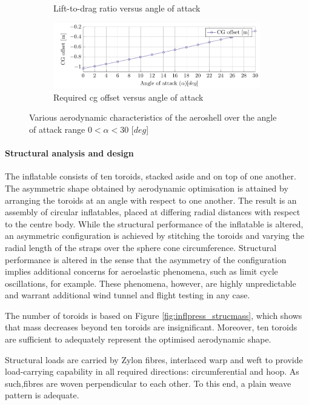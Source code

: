 \begin{figure}[h]
\begin{subfigure}[b]{0.49\textwidth}
 		\caption{Lift-to-drag ratio versus angle of attack}
 		\label{fig:CLCDAlpha}
 	\end{subfigure}
 	\begin{subfigure}[b]{0.49\textwidth}
 		\includegraphics[width=0.99\textwidth]{./Figure/Aerodynamics/CGoAlpha.pdf}
 		\caption{Required \gls{cg} offset versus angle of attack}
 		\label{fig:CGOAlpha}
 	\end{subfigure}
 	\caption{Various aerodynamic characteristics of the aeroshell over the angle of attack range $0<\alpha<30$ [$deg$]}
 \end{figure}


\paragraph{Structural analysis and design}


The inflatable consists of ten toroids, stacked aside and on top of one another. The asymmetric shape obtained by aerodynamic optimisation is attained by arranging the toroids at an angle with respect to one another. The result is an assembly of circular inflatables, placed at differing radial distances with respect to the centre body. While the structural performance of the inflatable is altered, an asymmetric configuration is achieved by stitching the toroids and varying the radial length of the straps over the sphere cone circumference. Structural performance is altered in the sense that the asymmetry of the configuration implies additional concerns for aeroelastic phenomena, such as limit cycle oscillations, for example. These phenomena, however, are highly unpredictable and warrant additional wind tunnel and flight testing in any case. 

The number of toroids is based on Figure \ref{fig:inflpress_strucmass}, which shows that mass decreases beyond ten toroids are insignificant. Moreover, ten toroids are sufficient to adequately represent the optimised aerodynamic shape. 

Structural loads are carried by Zylon fibres, interlaced warp and weft to provide load-carrying capability in all required directions: circumferential and hoop. As such,fibres are woven perpendicular to each other. To this end, a plain weave pattern is adequate.

